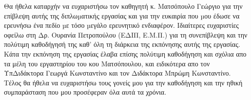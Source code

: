 \begin{acknowledgements}
Θα ήθελα καταρχήν να ευχαριστήσω τον καθηγητή κ. Ματσόπουλο Γεώργιο για την
επίβλεψη\- αυτής της διπλωµατικής εργασίας και για την ευκαιρία που µου έδωσε να ερευνήσω ένα πεδίο µε τόσο µεγάλο ερευνητικό ενδιαφέρον.
Ιδιαίτερες ευχαριστίες οφείλω στη Δρ. Ουρανία Πετροπούλου (ΕΔΙΠ, Ε.Μ.Π.) για τη συνεπίβλεψη
και την πολύτιμη καθοδήγησή της καθ' όλη τη διάρκεια της εκπόνησης αυτής της εργασίας.
Κάτα την εκπόνηση της εργασίας έλαβα επίσης
πολύτιμη καθοδήγηση και σχόλια απο τα μέλη του εργαστηρίου του κου Ματσόπουλου, και ειδικότερα απο τον ΥπΔιδάκτορα
Γεωργά Κωνσταντίνο και τον Διδάκτορα Μπρώμη Κωνσταντίνο.
Τέλος θα ήθελα να ευχαριστήσω τους γονείς
μου για την καθοδήγηση και την ηθική συμπαράσταση που μου
προσέφεραν όλα αυτά τα χρόνια.
\end{acknowledgements}

